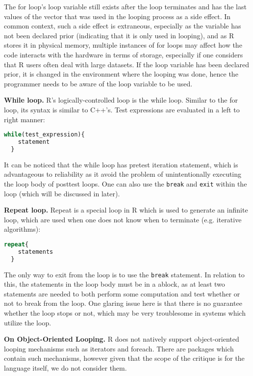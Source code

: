 \documentclass[12pt]{article}
\begin{document}
The for loop's loop variable still exists after the loop terminates and has the last values of the vector that was used in the looping process as a side effect. In common context, such a side effect is extraneous, especially as the variable has not been declared prior (indicating that it is only used in looping), and as R stores it in physical memory, multiple instances of for loops may affect how the code interacts with the hardware in terms of storage, especially if one considers that R users often deal with large datasets. If the loop variable has been declared prior, it is changed in the environment where the looping was done, hence the programmer needs to be aware of the loop variable to be used.

\textbf{While loop.} R's logically-controlled loop is the while loop. Similar to the for loop, its syntax is similar to C++'s. Test expressions are evaluated in a left to right manner:

\begin{lstlisting}[language=R, frame=none]
  while(test_expression){
    statement
  }
\end{lstlisting}

It can be noticed that the while loop has pretest iteration statement, which is advantageous to reliability as it avoid the problem of unintentionally executing the loop body of posttest loops. One can also use the \texttt{break} and \texttt{exit} within the loop (which will be discussed in later).

\textbf{Repeat loop.} Repeat is a special loop in R which is used to generate an infinite loop, which are used when one does not know when to terminate (e.g. iterative algorithms):

\begin{lstlisting}[language=R, frame=none]
  repeat{
    statements
  }
\end{lstlisting}

The only way to exit from the loop is to use the \texttt{break} statement. In relation to this, the statements in the loop body must be in a ablock, as at least two statements are needed to both perform some computation and test whether or not to break from the loop. One glaring issue here is that there is no guarantee whether the loop stops or not, which may be very troublesome in systems which utilize the loop.

\textbf{On Object-Oriented Looping.} R does not natively support object-oriented looping mechanisms such as iterators and foreach. There are packages which contain such mechanisms, however given that the scope of the critique is for the language itself, we do not consider them.
\end{document}
